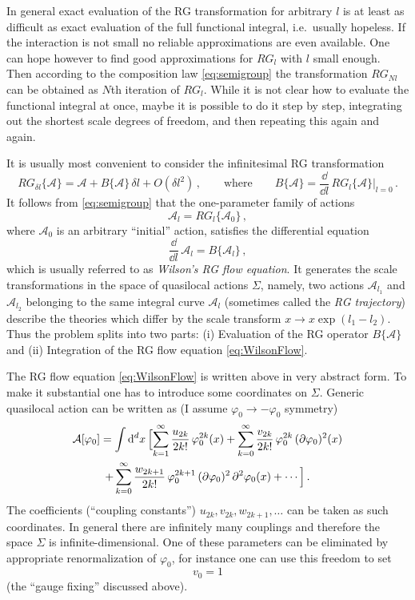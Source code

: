In general exact evaluation of the RG transformation for arbitrary $l$ is at
least as difficult as exact evaluation of the full functional integral, i.e.\
usually hopeless. If the interaction is not small no reliable approximations are
even available. One can hope however to find good approximations for $RG_l$ with
$l$ small enough. Then according to the composition law \eqref{eq:semigroup} the
transformation $RG_{Nl}$ can be obtained as $N$th iteration of $RG_l$. While it
is not clear how to evaluate the functional integral at once, maybe it is
possible to do it step by step, integrating out the shortest scale degrees of
freedom, and then repeating this again and again.

It is usually most convenient to consider the infinitesimal RG transformation
\[
RG_{\delta l}\{\mathcal A\}=\mathcal A+B\{\mathcal A\}\,\delta l+O(\delta l^2)\,,
\qquad\text{where}\qquad
B\{\mathcal A\}=\frac{\dd}{\dd l}\,RG_l\{\mathcal A\}\Big|_{l=0}\,.
\]
It follows from \eqref{eq:semigroup} that the one-parameter family of actions
\[
\mathcal A_l=RG_l\{\mathcal A_0\}\,,
\]
where $\mathcal A_0$ is an arbitrary ``initial'' action, satisfies the differential
equation
\begin{equation}\label{eq:WilsonFlow}
\frac{\dd}{\dd l}\,\mathcal A_l=B\{\mathcal A_l\}\,,
\end{equation}
which is usually referred to as \emph{Wilson's RG flow equation}. It generates the
scale transformations in the space of quasilocal actions $\Sigma$, namely, two
actions $\mathcal A_{l_1}$ and $\mathcal A_{l_2}$ belonging to the same integral
curve $\mathcal A_l$ (sometimes called the \emph{RG trajectory}) describe the
theories which differ by the scale transform $x\to x\exp(l_1-l_2)$. Thus the
problem splits into two parts: (i) Evaluation of the RG operator
$B\{\mathcal A\}$ and (ii) Integration of the RG flow equation
\eqref{eq:WilsonFlow}.

The RG flow equation \eqref{eq:WilsonFlow} is written above in very abstract
form. To make it substantial one has to introduce some coordinates on $\Sigma$.
Generic quasilocal action can be written as (I assume $\varphi_0\to-\varphi_0$
symmetry)
\begin{multline}\label{eq:quasilocal}
\mathcal A[\varphi_0]=\int \mathop{}\!\mathrm{d}^dx\,\Bigl[\sum_{k=1}^\infty\frac{u_{2k}}{2k!}\,\varphi_0^{2k}(x)+\sum_{k=0}^\infty\frac{v_{2k}}{2k!}\,\varphi_0^{2k}\,(\partial\varphi_0)^2(x)\\
+\sum_{k=0}^\infty\frac{w_{2k+1}}{2k!}\,\varphi_0^{2k+1}\,(\partial\varphi_0)^2\,\partial^2\varphi_0(x)+\cdots\Bigr]\,.
\end{multline}
The coefficients (``coupling constants'') $u_{2k},v_{2k},w_{2k+1},\dots$ can be
taken as such coordinates. In general there are infinitely many couplings and
therefore the space $\Sigma$ is infinite-dimensional. One of these parameters
can be eliminated by appropriate renormalization of $\varphi_0$, for instance one
can use this freedom to set
\[
v_0=1
\]
(the ``gauge fixing'' discussed above).

